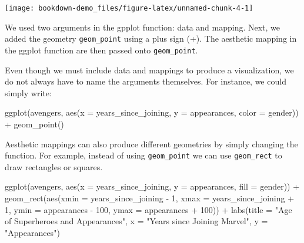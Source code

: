\documentclass[
]{book}
\newenvironment{Shaded}{\begin{snugshade}}{\end{snugshade}}
\newcommand{\AttributeTok}[1]{\textcolor[rgb]{0.77,0.63,0.00}{#1}}
\newcommand{\DecValTok}[1]{\textcolor[rgb]{0.00,0.00,0.81}{#1}}
\newcommand{\FunctionTok}[1]{\textcolor[rgb]{0.00,0.00,0.00}{#1}}
\newcommand{\NormalTok}[1]{#1}
\newcommand{\SpecialCharTok}[1]{\textcolor[rgb]{0.00,0.00,0.00}{#1}}
\newcommand{\StringTok}[1]{\textcolor[rgb]{0.31,0.60,0.02}{#1}}
\begin{document}
\begin{center}\texttt{[image: bookdown-demo\_files/figure-latex/unnamed-chunk-4-1]} \end{center}

We used two arguments in the gpplot function: data and mapping. Next, we added the geometry \texttt{geom\_point} using a plus sign (+). The aesthetic mapping in the ggplot function are then passed onto \texttt{geom\_point}.

Even though we must include data and mappings to produce a visualization, we do not always have to name the arguments themselves. For instance, we could simply write:

\begin{Shaded}
\begin{Highlighting}[]
\FunctionTok{ggplot}\NormalTok{(avengers, }\FunctionTok{aes}\NormalTok{(}\AttributeTok{x =}\NormalTok{ years\_since\_joining,}
                     \AttributeTok{y =}\NormalTok{ appearances,}
                     \AttributeTok{color =}\NormalTok{ gender)) }\SpecialCharTok{+}
  \FunctionTok{geom\_point}\NormalTok{()}
\end{Highlighting}
\end{Shaded}

Aesthetic mappings can also produce different geometries by simply changing the function. For example, instead of using \texttt{geom\_point} we can use \texttt{geom\_rect} to draw rectangles or squares.

\begin{Shaded}
\begin{Highlighting}[]
\FunctionTok{ggplot}\NormalTok{(avengers, }\FunctionTok{aes}\NormalTok{(}\AttributeTok{x =}\NormalTok{ years\_since\_joining,}
                     \AttributeTok{y =}\NormalTok{ appearances,}
                     \AttributeTok{fill =}\NormalTok{ gender)) }\SpecialCharTok{+}
  \FunctionTok{geom\_rect}\NormalTok{(}\FunctionTok{aes}\NormalTok{(}\AttributeTok{xmin =}\NormalTok{ years\_since\_joining }\SpecialCharTok{{-}} \DecValTok{1}\NormalTok{,}
                \AttributeTok{xmax =}\NormalTok{ years\_since\_joining }\SpecialCharTok{+} \DecValTok{1}\NormalTok{,}
                \AttributeTok{ymin =}\NormalTok{ appearances }\SpecialCharTok{{-}} \DecValTok{100}\NormalTok{,}
                \AttributeTok{ymax =}\NormalTok{ appearances }\SpecialCharTok{+} \DecValTok{100}\NormalTok{)) }\SpecialCharTok{+}
    \FunctionTok{labs}\NormalTok{(}\AttributeTok{title =} \StringTok{"\textquotesingle{}Age\textquotesingle{} of Superheroes and Appearances"}\NormalTok{,}
       \AttributeTok{x =} \StringTok{"Years since Joining Marvel"}\NormalTok{,}
       \AttributeTok{y =} \StringTok{"Appearances"}\NormalTok{)}
\end{Highlighting}
\end{Shaded}
\end{document}
